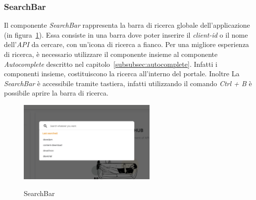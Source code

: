 \subsubsection{SearchBar}\label{subsubsec:search-bar}
Il componente \textit{SearchBar} rappresenta la barra di ricerca globale dell'applicazione (in figura~\ref{fig:search-bar}). 
Essa consiste in una barra dove poter inserire il \textit{client-id} o il nome dell'\textit{API} da cercare,
con un'icona di ricerca a fianco. Per una migliore esperienza di ricerca, è necessario utilizzare il componente insieme al componente \textit{Autocomplete} descritto nel capitolo~\ref{subsubsec:autocomplete}.
Infatti i componenti insieme, costituiscono la ricerca all'interno del portale. Inoltre La \textit{SearchBar} è accessibile tramite tastiera,
infatti utilizzando il comando \textit{Ctrl + B} è possibile aprire la barra di ricerca.\\

\begin{figure}[ht]
  \centering
  \includegraphics[width=0.6\textwidth, alt={Barra di ricerca globale dell'applicazione}]{images/frontend/SearchBar.jpg}
  \caption{SearchBar}\label{fig:search-bar}
\end{figure}
\pagebreak

